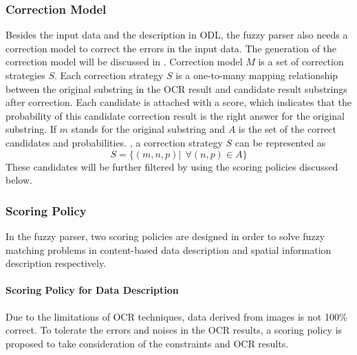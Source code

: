 \subsubsection{Correction Model}
\label{sec:corrmodel}
Besides the input data and the description in ODL, the fuzzy parser 
also needs a correction model to correct the errors in the input data. 
The generation of the correction model will be discussed in 
. Correction model $M$ is a set of correction 
strategies $S$. 
Each correction strategy $S$ is a one-to-many mapping relationship between 
the original substring in the OCR result and candidate result substrings 
after correction. Each candidate is attached with a score, 
which indicates that the probability of this candidate correction result is 
the right answer for the original substring. 
If $m$ stands for the original substring and $A$ is the 
set of the correct candidates and probabilities. 
, a correction strategy $S$ can be represented as 
\begin{equation}
S=\{(m, n, p)|~~\forall (n, p) \in A\}
\end{equation}
These candidates will be further filtered by using the scoring policies 
discussed below. 

\subsubsection{Scoring Policy}
\label{sec:score}
In the fuzzy parser, two scoring policies are designed 
in order to solve fuzzy matching 
problems in content-based data description and spatial information description respectively.

\paragraph{Scoring Policy for Data Description}
Due to the limitations of OCR techniques, data derived from images is not 100\% 
correct. To tolerate the errors and noises in the OCR results, a scoring 
policy is proposed to take consideration of the constraints and OCR results. 

